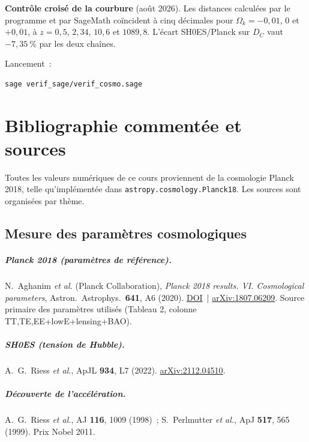 \documentclass[11pt,a4paper,openany]{report}
\newcommand{\Ok}{\Omega_{k}}
\begin{document}
\begin{tcolorbox}[numerique]
\textbf{Contrôle croisé de la courbure} (août 2026). Les distances calculées
par le programme et par SageMath coïncident à cinq décimales pour
$\Ok = -0{,}01$, $0$ et $+0{,}01$, à $z = 0{,}5$, $2{,}34$, $10{,}6$ et
$1089{,}8$. L'écart SH0ES/Planck sur $D_{C}$ vaut $-7{,}35~\%$ par les deux
chaînes.
\end{tcolorbox}

\noindent Lancement~:
\begin{verbatim}
sage verif_sage/verif_cosmo.sage
\end{verbatim}

\chapter{Bibliographie commentée et sources}
\label{chap:biblio}

Toutes les valeurs numériques de ce cours proviennent de la cosmologie
Planck 2018, telle qu'implémentée dans \texttt{astropy.cosmology.Planck18}.
Les sources sont organisées par thème.

\section{Mesure des paramètres cosmologiques}

\paragraph{Planck 2018 (paramètres de référence).}
N.~Aghanim \emph{et al.} (Planck Collaboration), \emph{Planck 2018 results.
VI. Cosmological parameters}, Astron.\ Astrophys.\ \textbf{641}, A6 (2020).
\href{https://doi.org/10.1051/0004-6361/201833910}{DOI}~|
\href{https://arxiv.org/abs/1807.06209}{arXiv:1807.06209}.
Source primaire des paramètres utilisés
(Tableau 2, colonne TT,TE,EE+lowE+lensing+BAO).

\paragraph{SH0ES (tension de Hubble).}
A.~G.~Riess \emph{et al.}, ApJL \textbf{934}, L7 (2022).
\href{https://arxiv.org/abs/2112.04510}{arXiv:2112.04510}.

\paragraph{Découverte de l'accélération.}
A.~G.~Riess \emph{et al.}, AJ \textbf{116}, 1009 (1998)~;
S.~Perlmutter \emph{et al.}, ApJ \textbf{517}, 565 (1999).
Prix Nobel 2011.
\end{document}
